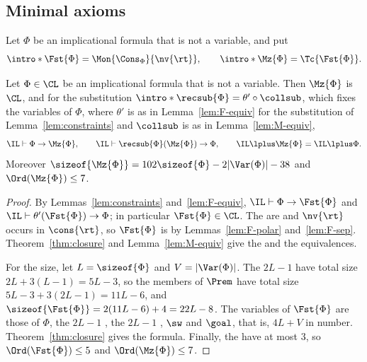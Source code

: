 \subsection{Minimal axioms}\label{sec:first-layer}

Let $\Phi$ be an implicational formula that is not a variable, and put
\[
\intro*\Fst{\Phi}=\Mon{\Cons_\Phi}{\nv{\rt}},\qquad
\intro*\Mz{\Phi}=\Tc{\Fst{\Phi}} .
\]

\begin{theorem}\label{thm:first-layer}
Let $\Phi\in\CL$ be an implicational formula that is not a variable. Then
$\Mz{\Phi}$ is  $\CL$, and for the substitution
$\intro*\recsub{\Phi}=\theta'\circ\collsub$, which fixes the variables of
$\Phi$, where $\theta'$ is as in Lemma~\ref{lem:F-equiv} for the
substitution of Lemma~\ref{lem:constraints} and $\collsub$ is as in
Lemma~\ref{lem:M-equiv},
\[
\IL\vdash\Phi\to\Mz{\Phi},\qquad
\IL\vdash\recsub{\Phi}(\Mz{\Phi})\to\Phi,\qquad
\IL\lplus\Mz{\Phi}=\IL\lplus\Phi .
\]
Moreover
$\sizeof{\Mz{\Phi}}=102\sizeof{\Phi}-2|\Var(\Phi)|-38$ and
$\Ord(\Mz{\Phi})\le7$.
\end{theorem}
\begin{proof}
By Lemmas~\ref{lem:constraints} and~\ref{lem:F-equiv},
$\IL\vdash\Phi\to\Fst{\Phi}$ and $\IL\vdash\theta'(\Fst{\Phi})\to\Phi$; in
particular $\Fst{\Phi}\in\CL$. The  are
 and $\nv{\rt}$ occurs in $\cons{\rt}$, so $\Fst{\Phi}$ is
 by Lemmas~\ref{lem:F-polar} and~\ref{lem:F-sep}.
Theorem~\ref{thm:closure} and Lemma~\ref{lem:M-equiv} give the
 and the equivalences.

For the size, let $L=\sizeof{\Phi}$ and $V=|\Var(\Phi)|$. The $2L-1$
 have total size $2L+3(L-1)=5L-3$, so the members of
$\Prem$ have total size $5L-3+3(2L-1)=11L-6$, and
$\sizeof{\Fst{\Phi}}=2(11L-6)+4=22L-8$. The variables of $\Fst{\Phi}$ are
those of $\Phi$, the $2L-1$ , the $2L-1$
, $\sw$ and $\goal$, that is, $4L+V$ in number.
Theorem~\ref{thm:closure} gives the formula. Finally, the  have  at most $3$, so $\Ord(\Fst{\Phi})\le5$ and
$\Ord(\Mz{\Phi})\le7$.
\end{proof}

